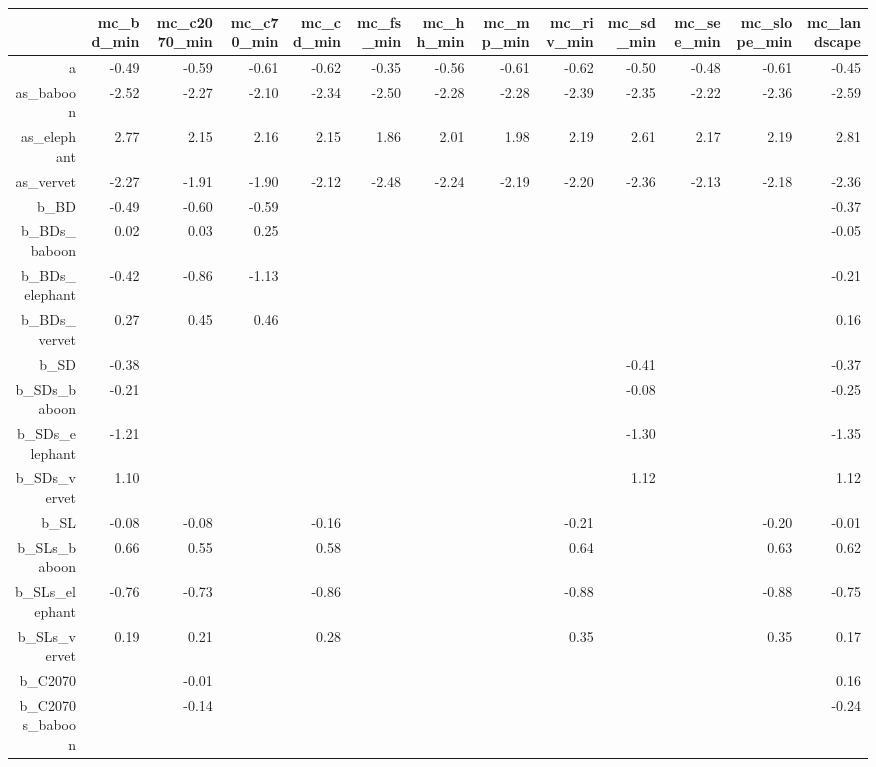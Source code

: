 \begin{table}[ht]
\centering
\begin{tabular}{rrrrrrrrrrrrr}
  \hline
 & mc\_bd\_min & mc\_c2070\_min & mc\_c70\_min & mc\_cd\_min & mc\_fs\_min & mc\_hh\_min & mc\_mp\_min & mc\_riv\_min & mc\_sd\_min & mc\_see\_min & mc\_slope\_min & mc\_landscape \\ 
  \hline
a & -0.49 & -0.59 & -0.61 & -0.62 & -0.35 & -0.56 & -0.61 & -0.62 & -0.50 & -0.48 & -0.61 & -0.45 \\ 
  as\_baboon & -2.52 & -2.27 & -2.10 & -2.34 & -2.50 & -2.28 & -2.28 & -2.39 & -2.35 & -2.22 & -2.36 & -2.59 \\ 
  as\_elephant & 2.77 & 2.15 & 2.16 & 2.15 & 1.86 & 2.01 & 1.98 & 2.19 & 2.61 & 2.17 & 2.19 & 2.81 \\ 
  as\_vervet & -2.27 & -1.91 & -1.90 & -2.12 & -2.48 & -2.24 & -2.19 & -2.20 & -2.36 & -2.13 & -2.18 & -2.36 \\ 
  b\_BD & -0.49 & -0.60 & -0.59 &  &  &  &  &  &  &  &  & -0.37 \\ 
  b\_BDs\_baboon & 0.02 & 0.03 & 0.25 &  &  &  &  &  &  &  &  & -0.05 \\ 
  b\_BDs\_elephant & -0.42 & -0.86 & -1.13 &  &  &  &  &  &  &  &  & -0.21 \\ 
  b\_BDs\_vervet & 0.27 & 0.45 & 0.46 &  &  &  &  &  &  &  &  & 0.16 \\ 
  b\_SD & -0.38 &  &  &  &  &  &  &  & -0.41 &  &  & -0.37 \\ 
  b\_SDs\_baboon & -0.21 &  &  &  &  &  &  &  & -0.08 &  &  & -0.25 \\ 
  b\_SDs\_elephant & -1.21 &  &  &  &  &  &  &  & -1.30 &  &  & -1.35 \\ 
  b\_SDs\_vervet & 1.10 &  &  &  &  &  &  &  & 1.12 &  &  & 1.12 \\ 
  b\_SL & -0.08 & -0.08 &  & -0.16 &  &  &  & -0.21 &  &  & -0.20 & -0.01 \\ 
  b\_SLs\_baboon & 0.66 & 0.55 &  & 0.58 &  &  &  & 0.64 &  &  & 0.63 & 0.62 \\ 
  b\_SLs\_elephant & -0.76 & -0.73 &  & -0.86 &  &  &  & -0.88 &  &  & -0.88 & -0.75 \\ 
  b\_SLs\_vervet & 0.19 & 0.21 &  & 0.28 &  &  &  & 0.35 &  &  & 0.35 & 0.17 \\ 
  b\_C2070 &  & -0.01 &  &  &  &  &  &  &  &  &  & 0.16 \\ 
  b\_C2070s\_baboon &  & -0.14 &  &  &  &  &  &  &  &  &  & -0.24 \\ 

\end{tabular}
\end{table}
